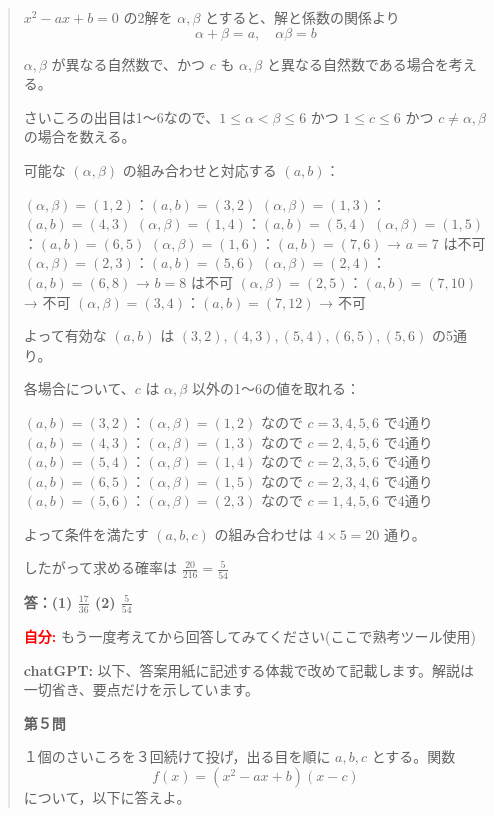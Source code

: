 \documentclass[a4j,uplatex]{jsarticle}
\newcommand{\speakerA}[1]{\textbf{\textcolor{red}{#1}}}
\newcommand{\speakerB}[1]{\textbf{\textcolor{green!60!black}{#1}}}
\newenvironment{dialogue}
{%
    \begin{quote}
        \setlength{\parskip}{0.5em}
        \setlength{\parindent}{0em}
        }
        {%
    \end{quote}
}
\newcommand{\sayA}[2]{\speakerA{#1:} #2\par}
\newcommand{\sayB}[2]{\speakerB{#1:} #2\par}
\theoremstyle{definition}
\begin{document}
\begin{dialogue}
{        $x^2 - ax + b = 0$ の2解を $\alpha, \beta$ とすると、解と係数の関係より
        $$\alpha + \beta = a, \quad \alpha \beta = b$$

        $\alpha, \beta$ が異なる自然数で、かつ $c$ も $\alpha, \beta$ と異なる自然数である場合を考える。

        さいころの出目は1〜6なので、$1 \leq \alpha < \beta \leq 6$ かつ $1 \leq c \leq 6$ かつ $c \neq \alpha, \beta$ の場合を数える。

        可能な $(\alpha, \beta)$ の組み合わせと対応する $(a, b)$：

        $(\alpha, \beta) = (1, 2)$：$(a, b) = (3, 2)$
        $(\alpha, \beta) = (1, 3)$：$(a, b) = (4, 3)$
        $(\alpha, \beta) = (1, 4)$：$(a, b) = (5, 4)$
        $(\alpha, \beta) = (1, 5)$：$(a, b) = (6, 5)$
        $(\alpha, \beta) = (1, 6)$：$(a, b) = (7, 6)$ → $a = 7$ は不可
        $(\alpha, \beta) = (2, 3)$：$(a, b) = (5, 6)$
        $(\alpha, \beta) = (2, 4)$：$(a, b) = (6, 8)$ → $b = 8$ は不可
        $(\alpha, \beta) = (2, 5)$：$(a, b) = (7, 10)$ → 不可
        $(\alpha, \beta) = (3, 4)$：$(a, b) = (7, 12)$ → 不可

        よって有効な $(a, b)$ は $(3, 2), (4, 3), (5, 4), (6, 5), (5, 6)$ の5通り。

        各場合について、$c$ は $\alpha, \beta$ 以外の1〜6の値を取れる：

        $(a, b) = (3, 2)$：$(\alpha, \beta) = (1, 2)$ なので $c = 3, 4, 5, 6$ で4通り
        $(a, b) = (4, 3)$：$(\alpha, \beta) = (1, 3)$ なので $c = 2, 4, 5, 6$ で4通り
        $(a, b) = (5, 4)$：$(\alpha, \beta) = (1, 4)$ なので $c = 2, 3, 5, 6$ で4通り
        $(a, b) = (6, 5)$：$(\alpha, \beta) = (1, 5)$ なので $c = 2, 3, 4, 6$ で4通り
        $(a, b) = (5, 6)$：$(\alpha, \beta) = (2, 3)$ なので $c = 1, 4, 5, 6$ で4通り

        よって条件を満たす $(a, b, c)$ の組み合わせは $4 \times 5 = 20$ 通り。

        したがって求める確率は $\frac{20}{216} = \frac{5}{54}$

        \textbf{答：(1) $\frac{17}{36}$ (2) $\frac{5}{54}$}}

    \sayA{自分}{もう一度考えてから回答してみてください(ここで熟考ツール使用)}
    \sayB{chatGPT}{以下、答案用紙に記述する体裁で改めて記載します。解説は一切省き、要点だけを示しています。

        \textbf{第５問}

        １個のさいころを３回続けて投げ，出る目を順に $a,b,c$ とする。関数
        $$f(x)=( x^2-ax+b )( x-c )$$
        について，以下に答えよ。

}
\end{dialogue}
\end{document}
